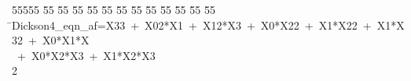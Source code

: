 %
%
\begin{tabbing}
55555 \= 55 \= 55 \= 55 \= 55 \= 55 \= 55 \= 55 \= 55 \= 55 \= 55 \= 55 \= 55 \= \>Dickson4\_eqn\_af=X33\ +\ X02*X1\ +\ X12*X3\ +\ X0*X22\ +\ X1*X22\ +\ X1*X32\ +\ X0*X1*X\\[0pt]
\ +\ X0*X2*X3\ +\ X1*X2*X3\\[0pt]
2\>\end{tabbing}
